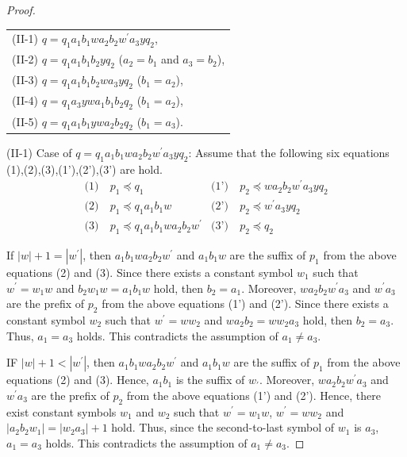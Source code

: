 \begin{proof}
\begin{tabular}{l}
(II-1) $q=q_{1}a_{1}b_{1}wa_{2}b_{2}w^{\prime}a_{3}yq_{2}$,\\
(II-2) $q=q_{1}a_{1}b_{1}b_{2}yq_{2}$ ($a_{2}=b_{1}$ and $a_{3}=b_{2}$),\\
(II-3) $q=q_{1}a_{1}b_{1}b_{2}wa_{3}yq_{2}$ ($b_{1}=a_{2}$),\\
(II-4) $q=q_{1}a_{3}ywa_{1}b_{1}b_{2}q_{2}$ ($b_{1}=a_{2}$),\\
(II-5) $q=q_{1}a_{1}b_{1}ywa_{2}b_{2}q_{2}$ ($b_{1}=a_{3}$).
\end{tabular}

\noindent
(II-1) Case of $q=q_{1}a_{1}b_{1}wa_{2}b_{2}w^{\prime}a_{3}yq_{2}$:
Assume that the following six equations (1),(2),(3),(1'),(2'),(3') are hold.
\begin{align*}
\textrm{(1)}~& p_{1} \preceq q_{1} & \textrm{(1')}~& p_{2} \preceq wa_{2}b_{2}w^{\prime}a_{3}yq_{2} \\
\textrm{(2)}~& p_{1} \preceq q_{1}a_{1}b_{1}w & \textrm{(2')}~& p_{2} \preceq w^{\prime}a_{3}yq_{2} \\
\textrm{(3)}~& p_{1} \preceq q_{1}a_{1}b_{1}wa_{2}b_{2}w^{\prime} & \textrm{(3')}~& p_{2} \preceq q_{2}
\end{align*}

\noindent
If $|w|+1=|w^{\prime}|$, then $a_{1}b_{1}wa_{2}b_{2}w^{\prime}$ and $a_{1}b_{1}w$ are the suffix of $p_{1}$ from the above equations (2) and (3).
Since there exists a constant symbol $w_{1}$ such that $w^{\prime}=w_{1}w$ and $b_{2}w_{1}w=a_{1}b_{1}w$ hold,
then $b_{2}=a_{1}$.
Moreover, $wa_{2}b_{2}w^{\prime}a_{3}$ and $w^{\prime}a_{3}$ are the prefix of $p_{2}$ from the above equations (1') and (2').
Since there exists a constant symbol $w_{2}$ such that $w^{\prime}=ww_{2}$ and $wa_{2}b_{2}=ww_{2}a_{3}$ hold,
then $b_{2}=a_{3}$.
Thus, $a_{1} = a_{3}$ holds.
This contradicts the assumption of $a_{1} \ne a_{3}$.

\noindent
IF $|w|+1 < |w^{\prime}|$, then $a_{1}b_{1}wa_{2}b_{2}w^{\prime}$ and $a_{1}b_{1}w$ are the suffix of $p_{1}$ from the above equations (2) and (3).
Hence, $a_{1}b_{1}$ is the suffix of $w_{\prime}$.
Moreover, $wa_{2}b_{2}w^{\prime}a_{3}$ and $w^{\prime}a_{3}$ are the prefix of $p_{2}$ from the above equations (1') and (2').
Hence, there exist constant symbols $w_{1}$ and $w_{2}$ such that $w^{\prime}=w_{1}w$, $w^{\prime}=ww_{2}$ and $|a_{2}b_{2}w_{1}|=|w_{2}a_{3}|+1$ hold.
Thus, since the second-to-last symbol of $w_{1}$ is $a_{3}$, $a_{1}=a_{3}$ holds.
This contradicts the assumption of $a_{1} \ne a_{3}$.


\end{proof}
